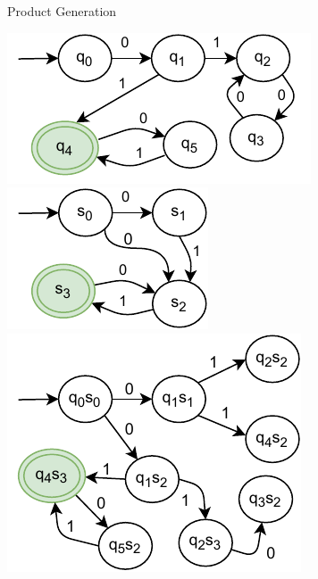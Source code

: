 \begin{frame}{Product Generation}


    \centering\includegraphics[scale=0.9]{img/excelatfit_diagrams-Original A.pdf}
    \centering\includegraphics[scale=0.9]{img/excelatfit_diagrams-Original B.pdf}
    \vfill
    \pause\centering\includegraphics[scale=0.9]{img/excelatfit_diagrams-Basic Product.pdf}
\end{frame}

